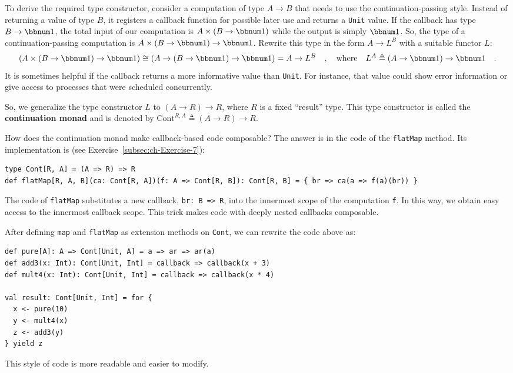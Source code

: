To derive the required type constructor, consider a computation of
type $A\rightarrow B$ that needs to use the continuation-passing
style. Instead of returning a value of type $B$, it registers a callback
function for possible later use and returns a \lstinline!Unit! value.
If the callback has type $B\rightarrow\bbnum 1$, the total input
of our computation is $A\times\left(B\rightarrow\bbnum 1\right)$
while the output is simply $\bbnum 1$. So, the type of a continuation-passing
computation is $A\times\left(B\rightarrow\bbnum 1\right)\rightarrow\bbnum 1$.
Rewrite this type in the form $A\rightarrow L^{B}$ with a suitable
functor $L$:
\[
\left(A\times\left(B\rightarrow\bbnum 1\right)\rightarrow\bbnum 1\right)\cong\left(A\rightarrow\left(B\rightarrow\bbnum 1\right)\rightarrow\bbnum 1\right)=A\rightarrow L^{B}\quad,\quad\text{where}\quad L^{A}\triangleq\left(A\rightarrow\bbnum 1\right)\rightarrow\bbnum 1\quad.
\]
It is sometimes helpful if the callback returns a more informative
value than \lstinline!Unit!. For instance, that value could show
error information or give access to processes that were scheduled
concurrently.

So, we generalize the type constructor $L$ to $\left(A\rightarrow R\right)\rightarrow R$,
where $R$ is a fixed \textsf{``}result\textsf{''} type. This type constructor is
called the \textbf{continuation monad}
and is denoted by $\text{Cont}^{R,A}\triangleq\left(A\rightarrow R\right)\rightarrow R$.

How does the continuation monad make callback-based code composable?
The answer is in the code of the \lstinline!flatMap! method. Its
implementation is (see Exercise~\ref{subsec:ch-Exercise-7}):
\begin{lstlisting}
type Cont[R, A] = (A => R) => R
def flatMap[R, A, B](ca: Cont[R, A])(f: A => Cont[R, B]): Cont[R, B] = { br => ca(a => f(a)(br)) }
\end{lstlisting}
The code of \lstinline!flatMap! substitutes a new callback, \lstinline!br: B => R!,
into the innermost scope of the computation \lstinline!f!. In this
way, we obtain easy access to the innermost callback scope. This trick
makes code with deeply nested callbacks composable.

After defining \lstinline!map! and \lstinline!flatMap! as extension
methods on \lstinline!Cont!, we can rewrite the code above as:
\begin{lstlisting}
def pure[A]: A => Cont[Unit, A] = a => ar => ar(a)
def add3(x: Int): Cont[Unit, Int] = callback => callback(x + 3)
def mult4(x: Int): Cont[Unit, Int] = callback => callback(x * 4)

val result: Cont[Unit, Int] = for {
  x <- pure(10)
  y <- mult4(x)
  z <- add3(y)
} yield z
\end{lstlisting}
This style of code is more readable and easier to modify.


